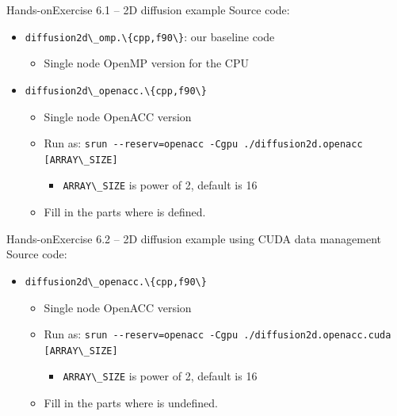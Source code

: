 \documentclass[12pt,aspectratio=169]{beamer}
\newcommand\shinline[2][]{\lstinline[style=shstyle,basicstyle=\ttfamily,#1]!#2!}
\begin{document}
\begin{frame}[fragile]{Hands-on}{Exercise 6.1 -- 2D diffusion example}
  Source code:
  \begin{itemize}
  \item \shinline{diffusion2d\_omp.\{cpp,f90\}}: our baseline code
    \begin{itemize}
    \item Single node OpenMP version for the CPU
    \end{itemize}
  \item \shinline{diffusion2d\_openacc.\{cpp,f90\}}
    \begin{itemize}
    \item Single node OpenACC version
      \item Run as: \shinline{srun --reserv=openacc -Cgpu ./diffusion2d.openacc [ARRAY\_SIZE]}
        \begin{itemize}
        \item \shinline{ARRAY\_SIZE} is power of 2, default is 16
        \end{itemize}
      \item Fill in the parts where  is defined.
    \end{itemize}
  \end{itemize}
\end{frame}

\begin{frame}[fragile]{Hands-on}{Exercise 6.2 -- 2D diffusion example using CUDA data management}
  Source code:
  \begin{itemize}
  \item \shinline{diffusion2d\_openacc.\{cpp,f90\}}
    \begin{itemize}
    \item Single node OpenACC version
      \item Run as: \shinline{srun --reserv=openacc -Cgpu ./diffusion2d.openacc.cuda [ARRAY\_SIZE]}
        \begin{itemize}
        \item \shinline{ARRAY\_SIZE} is power of 2, default is 16
        \end{itemize}
      \item Fill in the parts where  is undefined.
    \end{itemize}
  \end{itemize}
\end{frame}
\end{document}
